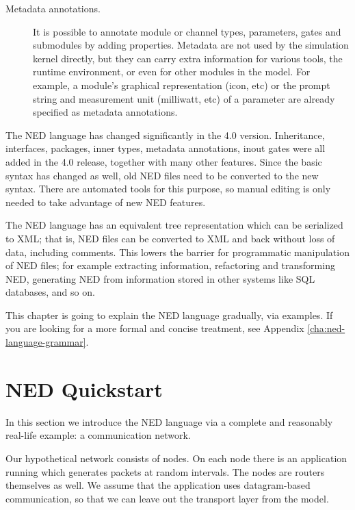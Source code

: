 \begin{description}
\item[Metadata annotations.] It is possible to annotate module or channel
types, parameters, gates and submodules by adding properties. Metadata are
not used by the simulation kernel directly, but they can carry extra
information for various tools, the runtime environment, or even for other
modules in the model. For example, a module's graphical representation
(icon, etc)  or the prompt string and measurement unit (milliwatt, etc) of a
parameter are already specified as metadata annotations.

\end{description}

\begin{note}
    The NED language has changed significantly in the 4.0 version.
    Inheritance, interfaces, packages, inner types, metadata annotations, inout
    gates were all added in the 4.0 release, together with many other features.
    Since the basic syntax has changed as well, old NED files need to be
    converted to the new syntax. There are automated tools for this purpose, so
    manual editing is only needed to take advantage of new NED features.
\end{note}

The NED language has an equivalent tree representation which can be
serialized to XML; that is, NED files can be converted to XML and back
without loss of data, including comments. This lowers the barrier for
programmatic manipulation of NED files; for example extracting information,
refactoring and transforming NED, generating NED from information stored in
other systems like SQL databases, and so on.

\begin{note}
    This chapter is going to explain the NED language gradually, via examples.
    If you are looking for a more formal and concise treatment, see
    Appendix \ref{cha:ned-language-grammar}.
\end{note}


\section{NED Quickstart}
\label{sec:ned-lang:warmup}

In this section we introduce the NED language via a complete and
reasonably real-life example: a communication network.

Our hypothetical network consists of nodes. On each node there is an
application running which generates packets at random intervals.
The nodes are routers themselves as well. We assume that the application
uses datagram-based communication, so that we can leave out the
transport layer from the model.


